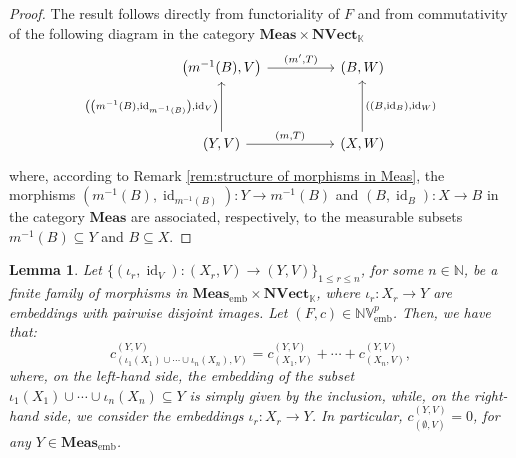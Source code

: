 \documentclass{amsart}
\theoremstyle{definition}
\theoremstyle{plain}
\newtheorem{lemma}[definition]{Lemma}
\newcommand{\N}{\mathbb{N}}
\newcommand{\id}{\operatorname{id}}
\newcommand{\Meas}{\mathbf{Meas}}
\newcommand{\embMeas}{\mathbf{Meas}_\mathrm{emb}}
\newcommand{\NVect}{\mathbf{NVect}_{\mathbb{K}}}
\newcommand{\NVembp}{\mathbb{NV}_{\mathrm{emb}}^p}
\begin{document}
        \begin{proof}
            The result follows directly from functoriality of $F$ and from commutativity of the following diagram in the category $\Meas \times \NVect$
            \begin{equation*}
                \begin{tikzcd}
                    \left( m^{-1}(B),V \right) \ar[rr, "{(m',T)}"] & & (B,W)  \\
                        & & \\
                    (Y,V) \ar[uu, "{\left( \left( m^{-1}(B),\id_{m^{-1}(B)} \right),\id_V \right)}"] \ar[rr, "{(m,T)}"] & & (X,W) \ar[uu, "{\left( \left( B,\id_B \right),\id _W \right)}"']
                \end{tikzcd}
            \end{equation*}
            where, according to Remark \ref{rem:structure of morphisms in Meas}, the morphisms $\left( m^{-1}(B),\id_{m^{-1}(B)} \right) \colon Y \rightarrow m^{-1}(B)$ and $\left( B,\id_B \right) \colon X \rightarrow B$ in the category $\Meas$ are associated, respectively, to the measurable subsets $m^{-1}(B) \subseteq Y$ and $B \subseteq X$.
        \end{proof}

        \begin{lemma}
        \label{lemma:functors and pairwise disjoint embeddings in the normed case}
            Let $\big\{ (\iota_r,\id_V) \colon (X_r,V) \rightarrow (Y,V) \big\}_{1 \leq r \leq n}$, for some $n \in \N$, be a finite family of morphisms in $\embMeas \times \NVect$, where $\iota_r \colon X_r \rightarrow Y$ are embeddings with pairwise disjoint images.
            Let $(F,c) \in \NVembp$. 
            Then, we have that:
            \begin{equation*}                           
                c_{\left( \iota_1(X_1) \cup \cdots \cup \iota_n(X_n),V \right)}^{(Y,V)} = c_{(X_1,V)}^{(Y,V)} + \cdots + c_{(X_n,V)}^{(Y,V)},
            \end{equation*}
            where, on the left-hand side, the embedding of the subset $\iota_1(X_1) \cup \cdots \cup \iota_n(X_n) \subseteq Y$ is simply given by the inclusion, while, on the right-hand side, we consider the embeddings $\iota_r \colon X_r \rightarrow Y$.
            In particular, $c_{(\emptyset,V)}^{(Y,V)} = 0$, for any $Y \in \embMeas$.
        \end{lemma}
\end{document}
